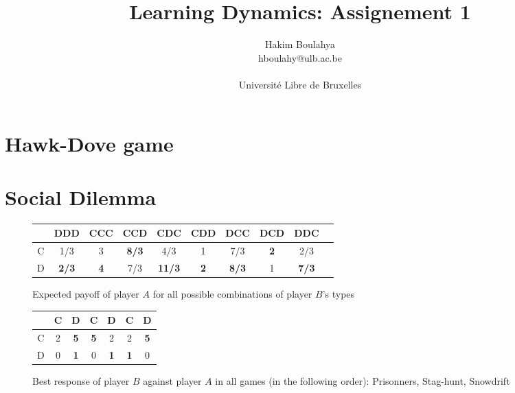 \documentclass[letterpaper]{article}
\title{Learning Dynamics: Assignement 1}
\author{\Large Hakim Boulahya \\
hboulahy@ulb.ac.be\\
\\
Université Libre de Bruxelles
}
\begin{document}
\maketitle


\section{Hawk-Dove game}

\section{Social Dilemma}

\begin{figure}[!ht]

\begin{center}
\begin{tabular}{|c|c|c|c|c|c|c|c|c|c|}
    \hline
    & DDD & CCC & CCD & CDC & CDD & DCC & DCD & DDC \\
    \hline
    C & 1/3 & 3 & \textbf{8/3} & 4/3 & 1 & 7/3 & \textbf{\color{red}2} & 2/3 \\
    \hline
    D & \textbf{2/3} & \textbf{4} & 7/3 & \textbf{11/3}
    & \textbf{2} & \textbf{8/3} & 1 & \textbf{\color{red}7/3} \\
    \hline
\end{tabular}
\end{center}

\caption{Expected payoff of player $A$ for all possible combinations of
player $B$’s types}
\label{fig:brA}
\end{figure}

\begin{figure}[!ht]

\begin{center}
\begin{tabular}{|c|c|c||c|c||c|c|}
    \hline
    & C & D & C & D & C & D \\
    \hline
    C & 2 & \textbf{5} & \textbf{5}
    & 2 & 2 & \textbf{5} \\
    \hline
    D & 0 & \textbf{1} & 0 & \textbf{1}
    & \textbf{1} & 0 \\
    \hline
\end{tabular}
\end{center}

\caption{Best response of player $B$ against player $A$ in all games
 (in the following order): Prisonners, Stag-hunt, Snowdrift}
\label{fig:brB}
\end{figure}
\end{document}
